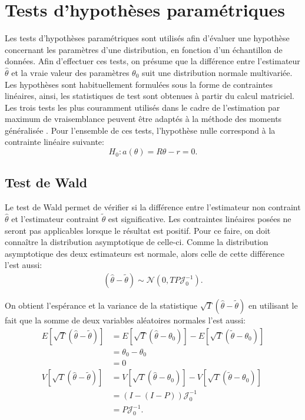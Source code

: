 \section{Tests d'hypothèses paramétriques}
\label{sec:testparam}

Les tests d'hypothèses paramétriques sont utilisés afin d'évaluer une
hypothèse concernant les paramètres d'une distribution, en fonction
d'un échantillon de données. Afin d'effectuer ces tests, on présume
que la différence entre l'estimateur $\hat\theta$ et la vraie valeur
des paramètres $\theta_0$ suit une distribution normale
multivariée. Les hypothèses sont habituellement formulées sous la
forme de contraintes linéaires, ainsi, les statistiques de test sont
obtenues à partir du calcul matriciel. Les trois tests les plus
couramment utilisés dans le cadre de l'estimation par maximum de
vraisemblance peuvent être adaptés à la méthode des moments
généralisée \citep{newey1994large}. Pour l'ensemble de ces tests,
l'hypothèse nulle correspond à la contrainte linéaire suivante:
\begin{equation}
  \label{eq:hypcontraintelin}
  H_0: a(\theta) = R\theta - r = 0.
\end{equation}

\subsection{Test de Wald}
\label{sec:testwald}

Le test de Wald permet de vérifier si la différence entre l'estimateur
non contraint $\hat\theta$ et l'estimateur contraint $\tilde\theta$
est significative. Les contraintes linéaires posées ne seront pas
applicables lorsque le résultat est positif. Pour ce faire, on doit
connaître la distribution asymptotique de celle-ci. Comme la
distribution asymptotique des deux estimateurs est normale, alors
celle de cette différence l'est aussi:
\begin{align}
  \label{eq:7}
  (\hat\theta - \tilde\theta) \sim \mathcal{N}(0,TP\mathcal{J}_0^{-1}).
\end{align}

On obtient l'espérance et la variance de la statistique
$\sqrt{T}\left(\hat\theta - \tilde\theta\right)$ en utilisant le fait
que la somme de deux variables aléatoires normales l'est aussi:
\begin{align}
  \label{eq:moyennevariancesomme}
  E\left[\sqrt{T}\left(\hat\theta - \tilde\theta\right) \right] &=
  E\left[\sqrt{T}\left(\hat\theta - \theta_0\right) \right] -
  E\left[\sqrt{T}\left(\tilde\theta - \theta_0\right) \right]\nonumber\\
  &= \theta_0 - \theta_0 \nonumber\\
  &= 0 \\
  V\left[\sqrt{T}\left(\hat\theta - \tilde\theta\right) \right] &=
  V\left[\sqrt{T}\left(\hat\theta - \theta_0\right) \right] -
  V\left[\sqrt{T}\left(\tilde\theta - \theta_0\right) \right]\nonumber\\
  &= \left(I-(I-P)\right)\mathcal{J}_0^{-1}\nonumber\\
  &= P\mathcal{J}_0^{-1}.
\end{align}

